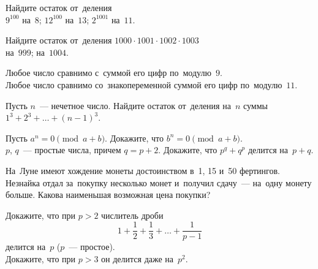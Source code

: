 



\begin{problems}

Найдите остаток от~деления
\\
\subproblem $9^{100}$ на~$8$;
\qquad
\subproblem $12^{100}$ на~$13$;
\qquad
\subproblem $2^{1001}$ на~$11$.

\item
Найдите остаток от~деления $1000\cdot1001\cdot1002\cdot1003$
\\
\subproblem на~$999$;
\qquad
\subproblem на~$1004$.

\item
\subproblem
Любое число сравнимо с~суммой его цифр по~модулю~$9$.
\\
\subproblem
Любое число сравнимо со~знакопеременной суммой его цифр по~модулю~$11$.

\item
Пусть $n$~--- нечетное число.
Найдите остаток от~деления на~$n$ суммы $1^3 + 2^3 + \ldots + (n - 1)^3$.

\item
\subproblem
Пусть $a^{n} = 0 \pmod{a + b}$.
Докажите, что $b^{n} = 0 \pmod{a + b}$.
\\
\subproblem
$p$, $q$~--- простые числа, причем $q = p + 2$.
Докажите, что $p^{q} + q^{p}$ делится на~$p + q$.

\item
На~Луне имеют хождение монеты достоинством в~1, 15 и~50 фертингов.
Незнайка отдал за~покупку несколько монет и~получил сдачу~--- на~одну монету
больше.
Какова наименьшая возможная цена покупки?

\item
\subproblem
Докажите, что при $p > 2$ числитель дроби
\[
    1 + \frac{1}{2} + \frac{1}{3} + \ldots + \frac{1}{p - 1}
\]
делится на~$p$ ($p$~--- простое).
\\
\subproblemx{*}
Докажите, что при $p > 3$ он делится даже на~$p^2$.

\end{problems}


